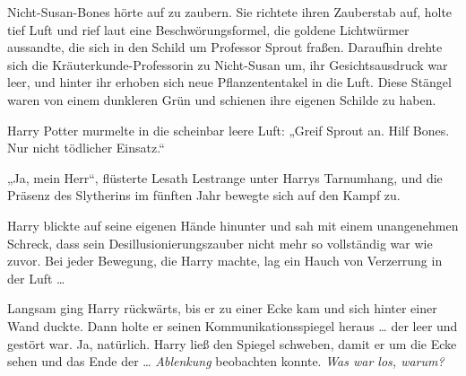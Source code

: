 Nicht-Susan-Bones hörte auf zu zaubern. Sie richtete ihren Zauberstab auf, holte tief Luft und rief laut eine Beschwörungsformel, die goldene Lichtwürmer aussandte, die sich in den Schild um Professor Sprout fraßen. Daraufhin drehte sich die Kräuterkunde-Professorin zu Nicht-Susan um, ihr Gesichtsausdruck war leer, und hinter ihr erhoben sich neue Pflanzententakel in die Luft. Diese Stängel waren von einem dunkleren Grün und schienen ihre eigenen Schilde zu haben.

Harry Potter murmelte in die scheinbar leere Luft:
„Greif Sprout an. Hilf Bones. Nur nicht tödlicher Einsatz.“

„Ja, mein Herr“, flüsterte Lesath Lestrange unter Harrys Tarnumhang, und die Präsenz des Slytherins im fünften Jahr bewegte sich auf den Kampf zu.

Harry blickte auf seine eigenen Hände hinunter und sah mit einem unangenehmen Schreck, dass sein Desillusionierungszauber nicht mehr so vollständig war wie zuvor. Bei jeder Bewegung, die Harry machte, lag ein Hauch von Verzerrung in der Luft …

Langsam ging Harry rückwärts, bis er zu einer Ecke kam und sich hinter einer Wand duckte. Dann holte er seinen Kommunikationsspiegel heraus … der leer und gestört war. Ja, natürlich. Harry ließ den Spiegel schweben, damit er um die Ecke sehen und das Ende der … \emph{Ablenkung} beobachten konnte.
\emph{Was war los, warum?}

